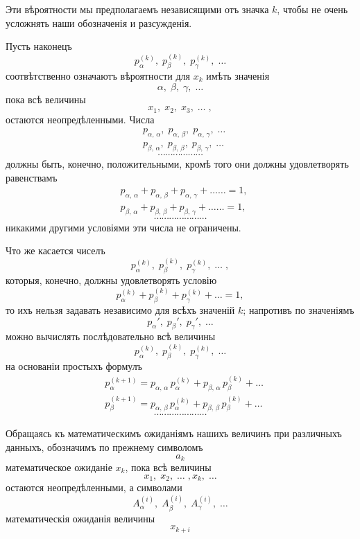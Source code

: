 \documentclass[12pt]{article}
\begin{document}
Эти вѣроятности мы предполагаемъ независящими отъ
значка $k$, чтобы не очень усложнять наши обозначенія и
разсужденія.

Пусть наконецъ
\[
p_{\alpha}^{(k)},\; p_{\beta}^{(k)},\; p_{\gamma}^{(k)},\;\ldots
\]
соотвѣтственно означаютъ вѣроятности для $x_k$ имѣть значенія
\[
\alpha,\; \beta,\; \gamma,\;\ldots
\]
пока всѣ величины
\[
x_1,\; x_2,\; x_3,\;\ldots\;,
\]
остаются неопредѣленными. Числа
\begin{align*}
& p_{\alpha,\,\alpha},\; p_{\alpha,\,\beta},\; p_{\alpha,\,\gamma},\;\ldots \\
& p_{\beta,\,\alpha},\; p_{\beta,\,\beta},\; p_{\beta,\,\gamma},\;\ldots
\end{align*}
\[
\cdots\cdots\cdots\cdots\cdots\cdots
\]
должны быть, конечно, положительными, кромѣ того они дол\-жны удовлетворять равенствамъ
\begin{align*}
& p_{\alpha,\,\alpha} + p_{\alpha,\,\beta} + p_{\alpha,\,\gamma} + \ldots\ldots = 1, \\
& p_{\beta,\,\alpha} + p_{\beta,\,\beta} + p_{\beta,\,\gamma} + \ldots\ldots = 1,
\end{align*}
\[
\cdots\cdots\cdots\cdots\cdots\cdots\cdots
\]
никакими другими условіями эти числа не ограничены.


Что же касается чиселъ
\[
p_{\alpha}^{(k)},\; p_{\beta}^{(k)},\; p_{\gamma}^{(k)},\;\ldots\;,
\]
которыя, конечно, должны удовлетворять условію
\[
p_{\alpha}^{(k)} + p_{\beta}^{(k)} + p_{\gamma}^{(k)} + \ldots = 1,
\]
то ихъ нельзя задавать независимо для всѣхъ значеній $k$;
напротивъ по значеніямъ
\[
p_{\alpha}',\; p_{\beta}',\; p_{\gamma}',\;\ldots
\]
можно вычислять послѣдовательно всѣ величины
\[
p_{\alpha}^{(k)},\; p_{\beta}^{(k)},\; p_{\gamma}^{(k)},\;\ldots
\]
на основаніи простыхъ формулъ
\begin{align*}
& p_{\alpha}^{(k+1)} = p_{\alpha,\,\alpha}\, p_{\alpha}^{(k)} + p_{\beta,\,\alpha}\, p_{\beta}^{(k)} + \ldots \\
& p_{\beta}^{(k+1)} = p_{\alpha,\,\beta}\, p_{\alpha}^{(k)} + p_{\beta,\,\beta}\, p_{\beta}^{(k)} + \ldots
\end{align*}
\[
\cdots\cdots\cdots\cdots\cdots\cdots\cdots
\]

Обращаясь къ математическимъ ожиданіямъ нашихъ ве\-личинъ при различныхъ данныхъ, обозначимъ по прежнему
символомъ
\[
a_k
\]
математическое ожиданіе $x_k$, пока всѣ величины
\[
x_1,\; x_2,\;\ldots\;, x_k,\;\ldots
\]
остаются неопредѣленными, а символами
\[
A_{\alpha}^{(i)},\; A_{\beta}^{(i)},\; A_{\gamma}^{(i)},\;\ldots
\]
математическія ожиданія величины
\[
x_{k+i}
\]
\end{document}
